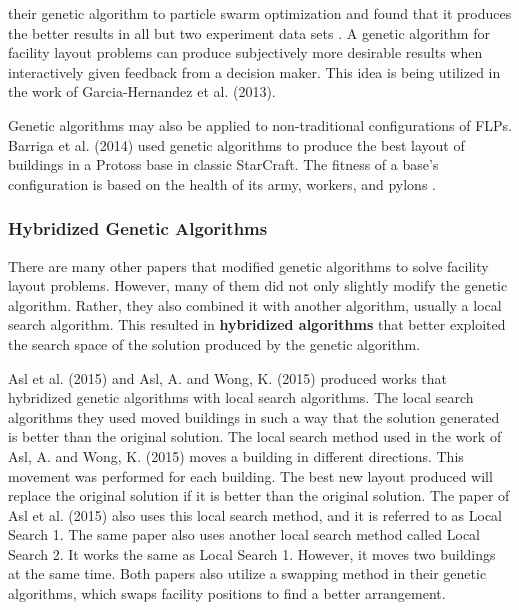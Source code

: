their genetic algorithm to particle swarm optimization and found that it produces the better results in all but two experiment data sets \cite{Peng2018}. A genetic algorithm for facility layout problems can produce subjectively more desirable results when interactively given feedback from a decision maker. This idea is being utilized in the work of Garcia-Hernandez et al. (2013). %

Genetic algorithms may also be applied to non-traditional configurations of FLPs. Barriga et al. (2014) used genetic algorithms to produce the best layout of buildings in a Protoss base in classic StarCraft. The fitness of a base's configuration is based on the health of its army, workers, and pylons \cite{Barriga2014}. %

\subsubsection{Hybridized Genetic Algorithms}
There are many other papers that modified genetic algorithms to solve facility layout problems. However, many of them did not only slightly modify the genetic algorithm. Rather, they also combined it with another algorithm, usually a local search algorithm. This resulted in \textbf{hybridized algorithms} that better exploited the search space of the solution produced by the genetic algorithm.

Asl et al. (2015) \cite{Asl2015} and Asl, A. and Wong, K. (2015) \cite{Asl2015a} produced works that hybridized genetic algorithms with local search algorithms. The local search algorithms they used moved buildings in such a way that the solution generated is better than the original solution. The local search method used in the work of Asl, A. and Wong, K. (2015) moves a building in different directions. This movement was performed for each building. The best new layout produced will replace the original solution if it is better than the original solution. The paper of Asl et al. (2015) also uses this local search method, and it is referred to as Local Search 1. The same paper also uses another local search method called Local Search 2. It works the same as Local Search 1. However, it moves two buildings at the same time. Both papers also utilize a swapping method in their genetic algorithms, which swaps facility positions to find a better arrangement.

